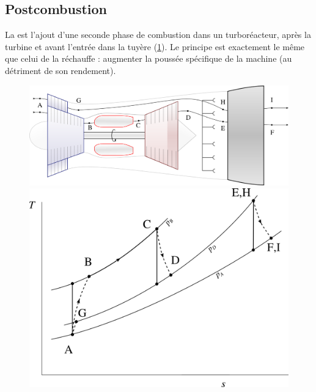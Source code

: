 	\subsection{Postcombustion}
	\label{ch_postcombustion}

		La  est l’ajout d’une seconde phase de combustion dans un turboréacteur, après la turbine et avant l’entrée dans la tuyère (\cref{fig_postcombustion}). Le principe est exactement le même que celui de la réchauffe : augmenter la poussée spécifique de la machine (au détriment de son rendement).

		\begin{figure}
			\begin{center}
				\includegraphics[scale=0.6]{images/circuit_postcombustion.png}\vspace{0.5cm}
				\includegraphics[scale=0.8]{images/ts_gp_postcombustion.png}
			\end{center}
			\label{fig_postcombustion}
		\end{figure}

